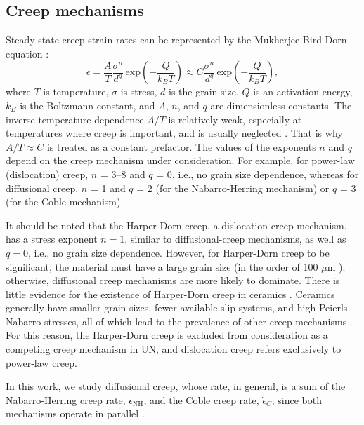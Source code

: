 \documentclass[preprint, 12pt]{elsarticle}
\newcommand{\?}{\stackrel{?}{=}}
\begin{document}
\subsection{Creep mechanisms}

Steady-state creep strain rates can be represented by the Mukherjee-Bird-Dorn equation \cite{Mukherjee2002}: 
\begin{equation}
\Dot{\epsilon} = \frac{A}{T} \frac{\sigma^n}{d^q} \, \mathrm{exp} \! \left( - \frac{Q}{k_B T} \right) \approx C \frac{\sigma^n}{d^q} \, \mathrm{exp} \! \left( - \frac{Q}{k_B T} \right),
\label{Eq:MBDEq}
\end{equation}
where $T$ is temperature, $\sigma$ is stress, $d$ is the grain size, $Q$ is an activation energy, $k_B$ is the Boltzmann constant, and $A$, $n$, and $q$ are dimensionless constants. The inverse temperature dependence $A/T$ is relatively weak, especially at temperatures where creep is important, and is usually neglected \cite{Dowling2020}. That is why $A/T \approx C$ is treated as a constant prefactor. The values of the exponents $n$ and $q$ depend on the creep mechanism under consideration. For example, for power-law (dislocation) creep, $n$ = 3--8 and $q$ = 0, i.e., no grain size dependence, whereas for diffusional creep, $n$ = 1 and $q$ = 2 (for the Nabarro-Herring mechanism) or $q$ = 3 (for the Coble mechanism).

It should be noted that the Harper-Dorn creep, a dislocation creep mechanism, has a stress exponent $n=1$, similar to diffusional-creep mechanisms, as well as $q=0$, i.e., no grain size dependence. However, for Harper-Dorn creep to be significant, the material must have a large grain size (in the order of 100 $\mu$m \cite{Meyers2009}); otherwise, diffusional creep mechanisms are more likely to dominate. There is little evidence for the existence of Harper-Dorn creep in ceramics \cite{Meyers2009}. Ceramics generally have smaller grain sizes, fewer available slip systems, and high Peierls-Nabarro stresses, all of which lead to the prevalence of other creep mechanisms \cite{Meyers2009}. For this reason, the Harper-Dorn creep is excluded from consideration as a competing creep mechanism in UN, and dislocation creep refers exclusively to power-law creep.

In this work, we study diffusional creep, whose rate, in general, is a sum of the Nabarro-Herring creep rate, $\Dot{\epsilon}_{\mathrm{NH}}$, and the Coble creep rate, $\Dot{\epsilon}_C$, since both mechanisms operate in parallel \cite{Courtney2005}.
\end{document}
